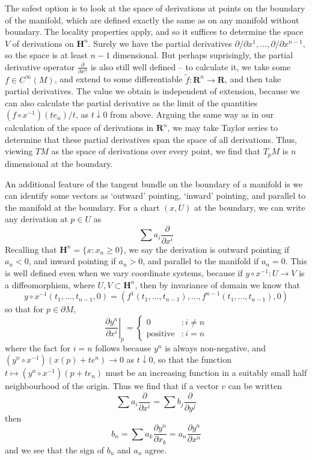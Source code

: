 The safest option is to look at the space of derivations at points on the boundary of the manifold, which are defined exactly the same as on any manifold without boundary. The locality properties apply, and so it suffices to determine the space $V$ of derivations on $\mathbf{H}^n$. Surely we have the partial derivatives $\partial/\partial x^1, \dots, \partial / \partial x^{n-1}$, so the space is at least $n-1$ dimensional. But perhaps suprisingly, the partial derivative operator $\frac{\partial}{\partial x^n}$ is also still well defined -- to calculate it, we take some $f \in C^\infty(M)$, and extend to some differentiable $\tilde{f}: \mathbf{R}^n \to \mathbf{R}$, and then take partial derivatives. The value we obtain is independent of extension, because we can also calculate the partial derivative as the limit of the quantities $(f \circ x^{-1})(te_n)/t$, as $t \downarrow 0$ from above. Arguing the same way as in our calculation of the space of derivations in $\mathbf{R}^n$, we may take Taylor series to determine that these partial derivatives span the space of all derivations. Thus, viewing $TM$ as the space of derivations over every point, we find that $T_pM$ is $n$ dimensional at the boundary.

An additional feature of the tangent bundle on the boundary of a manifold is we can identify some vectors as `outward' pointing, `inward' pointing, and parallel to the manifold at the boundary. For a chart $(x,U)$ at the boundary, we can write any derivation at $p \in U$ as
%
\[ \sum a_i \frac{\partial}{\partial x^i} \]
%
Recalling that $\mathbf{H}^n = \{ x: x_n \geq 0 \}$, we say the derivation is outward pointing if $a_n < 0$, and inward pointing if $a_n > 0$, and parallel to the manifold if $a_n = 0$. This is well defined even when we vary coordinate systems, because if $y \circ x^{-1}: U \to V$ is a diffeomorphism, where $U,V \subset \mathbf{H}^n$, then by invariance of domain we know that
%
\[ y \circ x^{-1}(t_1, \dots, t_{n-1}, 0) = (f^1(t_1, \dots, t_{n-1}), \dots, f^{n-1}(t_1, \dots, t_{n-1}), 0) \]
%
so that for $p \in \partial M$,
%
\[ \left.\frac{\partial y^n}{\partial x^i}\right|_p = \begin{cases} 0 &: i \neq n \\ \text{positive} &: i = n \end{cases} \]
%
where the fact for $i = n$ follows because $y^n$ is always non-negative, and $(y^n \circ x^{-1})(x(p) + te^n) \to 0$ as $t \downarrow 0$, so that the function $t \mapsto (y^n \circ x^{-1})(p + te_n)$ must be an increasing function in a suitably small half neighbourhood of the origin. Thus we find that if a vector $v$ can be written
%
\[ \sum a_i \frac{\partial}{\partial x^i} = \sum b_j \frac{\partial}{\partial y^j} \]
%
then
%
\[ b_n = \sum a_k \frac{\partial y^n}{\partial x_k} = a_n \frac{\partial y^n}{\partial x^n} \]
%
and we see that the sign of $b_n$ and $a_n$ agree.

